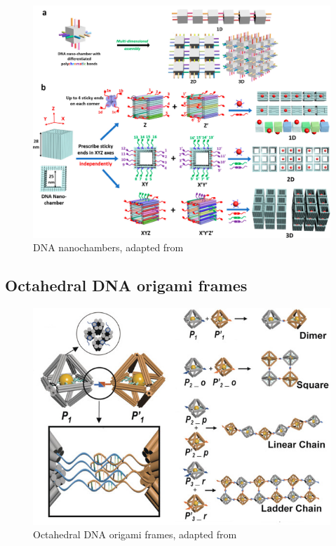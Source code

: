 \begin{figure}[h]
  \centering\includegraphics[width=\textwidth]{figures/nanochambers2.jpeg}
  \caption{DNA nanochambers, adapted from}
\end{figure}

\subsection{Octahedral DNA origami frames}

\begin{figure}[h]
  \centering\includegraphics[width=\textwidth]{figures/tian.jpg}
  \caption{Octahedral DNA origami frames, adapted from}
\end{figure}


